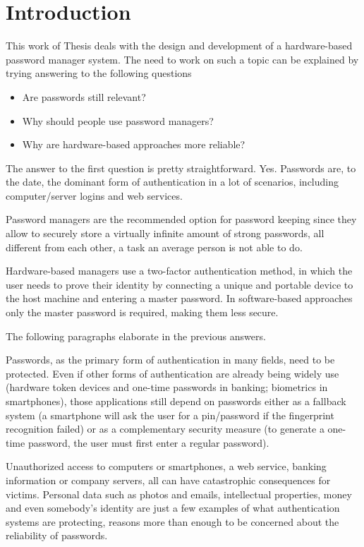 \chapter{Introduction}

This work of Thesis deals with the design and development of a hardware-based password manager system. The need to work on such a topic can be explained by trying answering to the following questions

\begin{itemize}
\setlength\itemsep{-3pt}
\item Are passwords still relevant?
\item Why should people use password managers?
\item Why are hardware-based approaches more reliable?
\end{itemize}

The answer to the first question is pretty straightforward. Yes. Passwords are, to the date, the dominant form of authentication in a lot of scenarios, including computer/server logins and web services. 

Password managers are the recommended option for password keeping since they allow to securely store a virtually infinite amount of strong passwords, all different from each other, a task an average person is not able to do.

Hardware-based managers use a two-factor authentication method, in which the user needs to prove their identity by connecting a unique and portable device to the host machine and entering a master password. In software-based approaches only the master password is required, making them less secure.

\vspace{8pt}
\noindent
The following paragraphs elaborate in the previous answers.

\vspace{6pt}
Passwords, as the primary form of authentication in many fields, need to be protected. Even if other forms of authentication are already being widely use (hardware token devices and one-time passwords in banking; biometrics in smartphones), those applications still depend on passwords either as a fallback system (a smartphone will ask the user for a pin/password if the fingerprint recognition failed) or as a complementary security measure (to generate a one-time password, the user must first enter a regular password).

Unauthorized access to computers or smartphones, a web service, banking information or company servers, all can have catastrophic consequences for victims. Personal data such as photos and emails, intellectual properties, money and even somebody’s identity are just a few examples of what authentication systems are protecting, reasons more than enough to be concerned about the reliability of passwords.


